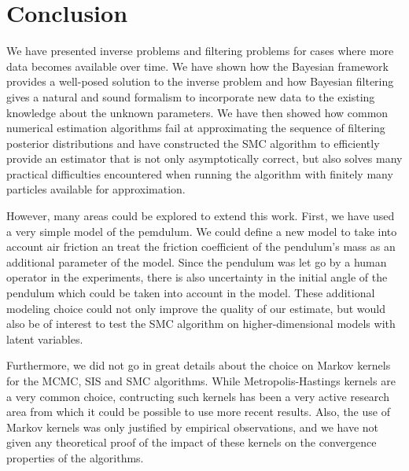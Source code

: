 \section{Conclusion}

We have presented inverse problems and filtering problems for cases where more data becomes available over time. We have shown how the Bayesian framework provides a well-posed solution to the inverse problem and how Bayesian filtering gives a natural and sound formalism to incorporate new data to the existing knowledge about the unknown parameters. We have then showed how common numerical estimation algorithms fail at approximating the sequence of filtering posterior distributions and have constructed the SMC algorithm to efficiently provide an estimator that is not only asymptotically correct, but also solves many practical difficulties encountered when running the algorithm with finitely many particles available for approximation.

However, many areas could be explored to extend this work. First, we have used a very simple model of the pemdulum. We could define a new model to take into account air friction an treat the friction coefficient of the pendulum's mass as an additional parameter of the model. Since the pendulum was let go by a human operator in the experiments, there is also uncertainty in the initial angle of the pendulum which could be taken into account in the model. These additional modeling choice could not only improve the quality of our estimate, but would also be of interest to test the SMC algorithm on higher-dimensional models with latent variables.

Furthermore, we did not go in great details about the choice on Markov kernels for the MCMC, SIS and SMC algorithms. While Metropolis-Hastings kernels are a very common choice, contructing such kernels has been a very active research area from which it could be possible to use more recent results. Also, the use of Markov kernels was only justified by empirical observations, and we have not given any theoretical proof of the impact of these kernels on the convergence properties of the algorithms.





